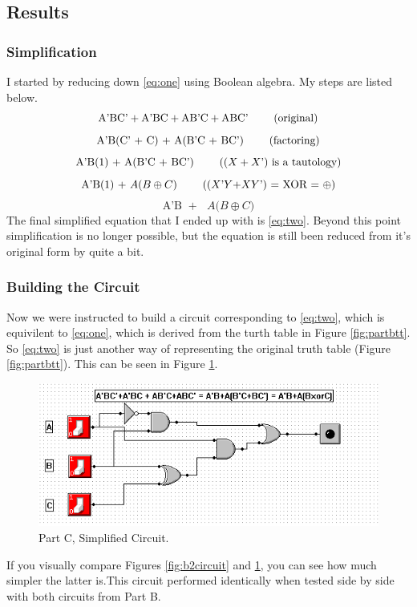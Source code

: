\documentclass[a4paper,11pt]{article}
\begin{document}
\subsection{Results}
\subsubsection{Simplification}
I started by reducing down \eqref{eq:one} using Boolean algebra. My steps are listed below.
 \[ \text{A'BC'} + \text{A'BC} + \text{AB'C} + \text{ABC' \qquad  (original)} \]
 \[ \text{A'B(C' $+$ C) $+$ A(B'C $+$ BC') \qquad (factoring)} \]
 \[ \text{A'B(1) $+$ A(B'C $+$ BC')  \qquad (($X+X$') is a tautology)} \]
 \[ \text{A'B(1) $+$ $A$($B \oplus C$)  \qquad (($X$'$Y$+$XY$') $=$ XOR = $\oplus$)} \]
\begin{equation} \label{eq:two} \text{A'B $+$ $A$($B \oplus C$)} \end{equation}
The final simplified equation that I ended up with is \eqref{eq:two}. Beyond this point simplification is no longer possible, but the equation is still been reduced from it's original form by quite a bit.

\subsubsection{Building the Circuit}
Now we were instructed to build a circuit corresponding to \eqref{eq:two}, which is equivilent to \eqref{eq:one}, which is derived from the turth table in Figure \ref{fig:partbtt}. So \eqref{eq:two} is just another way of representing the original truth table (Figure \ref{fig:partbtt}). This can be seen in Figure \ref{fig:partc}.
 \begin{figure}[h!]
   \centering
     \includegraphics[width=6.5in]{partc}
   \caption{Part C, Simplified Circuit.}
   \label{fig:partc}
\end{figure}   
If you visually compare Figures \ref{fig:b2circuit} and \ref{fig:partc}, you can see how much simpler the latter is.This circuit performed identically when tested side by side with both circuits from Part B. 
\end{document}
